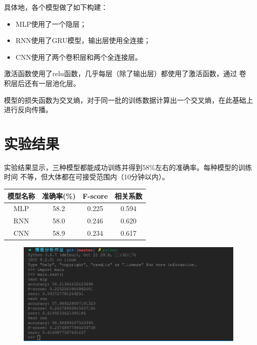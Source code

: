 \documentclass[a4paper]{article}
\begin{document}
    具体地，各个模型做了如下构建：
    \begin{itemize}
        \item MLP使用了一个隐层；
        \item RNN使用了GRU模型，输出层使用全连接；
        \item CNN使用了两个卷积层和两个全连接层。
    \end{itemize}
    
    激活函数使用了relu函数，几乎每层（除了输出层）都使用了激活函数，通过
    卷积层后还有一层池化层。
    
    模型的损失函数为交叉熵，对于同一批的训练数据计算出一个交叉熵，在此基础上进行反向传播。

    \newpage

    \section{实验结果}

    实验结果显示，三种模型都能成功训练并得到58\%左右的准确率。每种模型的训练时间
    不等，但大体都在可接受范围内（10分钟以内）。

    \begin{table}[H]
        \centering
        \begin{tabular}{cccc}
            \toprule
            模型名称 & 准确率(\%) & F-score & 相关系数\\
            \midrule
            MLP & 58.2 & 0.225 & 0.594 \\
            RNN & 58.0 & 0.246 & 0.620 \\
            CNN & 58.9 & 0.234 & 0.617 \\
            \bottomrule
        \end{tabular}
    \end{table}

    \begin{figure}[H]
        \centering
        \includegraphics[width=\linewidth]{assets/test.png}
    \end{figure}
\end{document}
